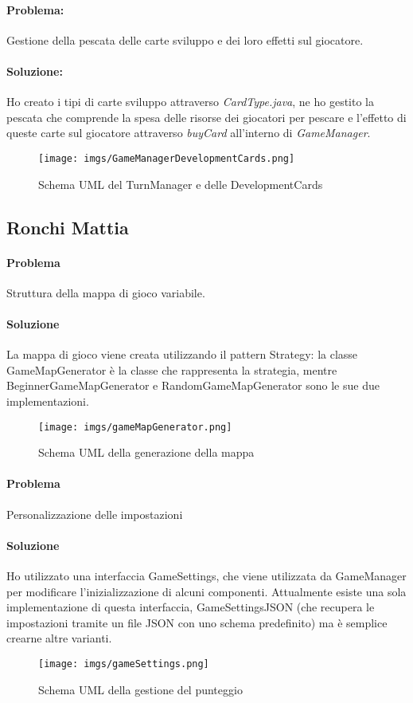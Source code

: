 \documentclass[a4paper,12pt]{report}
\begin{document}
\paragraph{Problema:}Gestione della pescata delle carte sviluppo e dei loro effetti sul giocatore.
\paragraph{Soluzione:}Ho creato i tipi di carte sviluppo attraverso \textit{CardType.java}, ne ho gestito la pescata che comprende la spesa delle risorse dei giocatori per pescare e l'effetto di queste carte sul giocatore attraverso \textit{buyCard} all'interno di \textit{GameManager}.
\begin{figure}[H]
\centering{}
\texttt{[image: imgs/GameManagerDevelopmentCards.png]}
\caption{Schema UML del TurnManager e delle DevelopmentCards}
\label{img:analysis}
\end{figure}
\subsection{Ronchi Mattia}
\paragraph{Problema} Struttura della mappa di gioco variabile.
\paragraph{Soluzione} La mappa di gioco viene creata utilizzando il pattern Strategy: la classe GameMapGenerator è la classe che rappresenta la strategia, mentre BeginnerGameMapGenerator e RandomGameMapGenerator sono le sue due implementazioni.
\begin{figure}[H]
\centering{}
\texttt{[image: imgs/gameMapGenerator.png]}
\caption{Schema UML della generazione della mappa}
\label{img:analysis}
\end{figure}
\paragraph{Problema} Personalizzazione delle impostazioni
\paragraph{Soluzione} Ho utilizzato una interfaccia GameSettings, che viene utilizzata da GameManager per modificare l'inizializzazione di alcuni componenti. Attualmente esiste una sola implementazione di questa interfaccia, GameSettingsJSON (che recupera le impostazioni tramite un file JSON con uno schema predefinito) ma è semplice crearne altre varianti.
\begin{figure}[H]
\centering{}
\texttt{[image: imgs/gameSettings.png]}
\caption{Schema UML della gestione del punteggio}
\label{img:analysis}
\end{figure}
\end{document}
